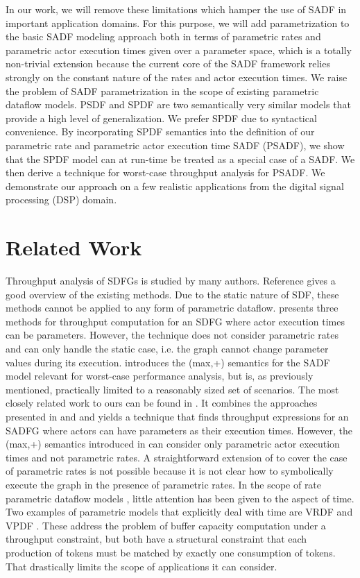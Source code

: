 \documentclass[]{eptcs}
\begin{document}
In our work, we will remove these limitations which hamper the use of SADF in important application domains. For this purpose, we will add parametrization to the basic SADF modeling approach both in terms of parametric rates and parametric actor execution times given over a parameter space, which is a totally non-trivial extension because the current core of the SADF framework relies strongly on the constant nature of the rates and actor execution times. We raise the problem of SADF parametrization in the scope of existing parametric dataflow models. PSDF \cite{2bhatt:all} and SPDF \cite{2frad:all} are two semantically very similar models that provide a high level of generalization. We prefer SPDF due to syntactical convenience. By incorporating SPDF semantics into the definition of our parametric rate and parametric actor execution time SADF (PSADF), we show that the SPDF model can at run-time be treated as a special case of a SADF. We then derive a technique for worst-case throughput analysis for PSADF. We demonstrate our approach on a few realistic applications from the digital signal processing (DSP) domain.
\section{Related Work}
Throughput analysis of SDFGs is studied by many authors. Reference \cite{2gha:all} gives a good overview of the existing methods. Due to the static nature of SDF, these methods cannot be applied to any form of parametric dataflow. \cite{3gha:all} presents three methods for throughput computation for an SDFG where actor execution times can be parameters. However, the technique does not consider parametric rates and can only handle the static case, i.e. the graph cannot change parameter values during its execution. \cite{2geil:all} introduces the (max,+) semantics for the SADF model relevant for worst-case performance analysis, but is, as previously mentioned, practically limited to a reasonably sized set of scenarios. The most closely related work to ours can be found in \cite{2dam:all}. It combines the approaches presented in \cite{2geil:all} and \cite{3gha:all} and yields a technique that finds throughput expressions for an SADFG where actors can have parameters as their execution times. However, the (max,+) semantics introduced in \cite{2dam:all} can consider only parametric actor execution times and not parametric rates. A straightforward extension of \cite{2dam:all} to cover the case of parametric rates is not possible because it is not clear how to symbolically execute the graph in the presence of parametric rates. In the scope of rate parametric dataflow models \cite{2bhatt:all}\cite{2frad:all}, little attention has been given to the aspect of time. Two examples of parametric models that explicitly deal with time are VRDF \cite{2wigg} and VPDF \cite{2wigg}. These address the problem of buffer capacity computation under a throughput constraint, but both have a structural constraint that each production of  tokens must be matched by exactly one consumption of  tokens. That drastically limits the scope of applications it can consider.
\end{document}
